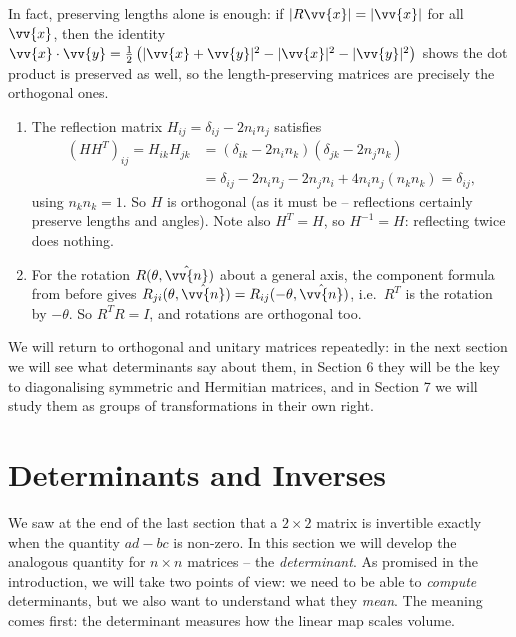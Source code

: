 In fact, preserving lengths alone is enough: if $|R\vv{x}| = |\vv{x}|$ for all $\vv{x}$, then the identity $\vv{x} \cdot \vv{y} = \frac{1}{2}\left(|\vv{x} + \vv{y}|^2 - |\vv{x}|^2 - |\vv{y}|^2\right)$ shows the dot product is preserved as well, so the length-preserving matrices are precisely the orthogonal ones.

\begin{example}
	\begin{enumerate}[label=(\roman*)]
		\item The reflection matrix $H_{ij} = \delta_{ij} - 2n_in_j$ satisfies
		\begin{align*}
			(HH^T)_{ij} = H_{ik}H_{jk} &= (\delta_{ik} - 2n_in_k)(\delta_{jk} - 2n_jn_k) \\
			&= \delta_{ij} - 2n_in_j - 2n_jn_i + 4n_in_j (n_kn_k) = \delta_{ij},
		\end{align*}
		using $n_k n_k = 1$. So $H$ is orthogonal (as it must be -- reflections certainly preserve lengths and angles). Note also $H^T = H$, so $H^{-1} = H$: reflecting twice does nothing.
		\item For the rotation $R(\theta, \hat{\vv{n}})$ about a general axis, the component formula from before gives $R_{ji}(\theta, \hat{\vv{n}}) = R_{ij}(-\theta, \hat{\vv{n}})$, i.e.\ $R^T$ is the rotation by $-\theta$. So $R^TR = I$, and rotations are orthogonal too.
	\end{enumerate}
\end{example}

We will return to orthogonal and unitary matrices repeatedly: in the next section we will see what determinants say about them, in Section 6 they will be the key to diagonalising symmetric and Hermitian matrices, and in Section 7 we will study them as groups of transformations in their own right.

\section{Determinants and Inverses}

We saw at the end of the last section that a $2 \times 2$ matrix is invertible exactly when the quantity $ad - bc$ is non-zero. In this section we will develop the analogous quantity for $n \times n$ matrices -- the \emph{determinant}. As promised in the introduction, we will take two points of view: we need to be able to \emph{compute} determinants, but we also want to understand what they \emph{mean}. The meaning comes first: the determinant measures how the linear map scales volume.


